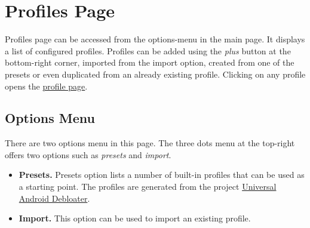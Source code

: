 \section{Profiles Page}\label{sec:profiles-page} %
Profiles page can be accessed from the options-menu in the main page. It displays a list of configured profiles.
Profiles can be added using the \textit{plus} button at the bottom-right corner, imported from the import option,
created from one of the presets or even duplicated from an already existing profile. Clicking on any profile opens the
\hyperref[sec:profile-page]{profile page}.

\subsection{Options Menu}\label{subsec:profiles-options-menu} %
There are two options menu in this page. The three dots menu at the top-right offers two options such as
\textit{presets} and \textit{import}.
\begin{itemize}
    \item \textbf{Presets.} Presets option lists a number of built-in profiles that can be used as a starting point.
    The profiles are generated from the project \href{https://gitlab.com/W1nst0n/universal-android-debloater}{Universal
    Android Debloater}.\\

    \item \textbf{Import.} This option can be used to import an existing profile.
\end{itemize}

